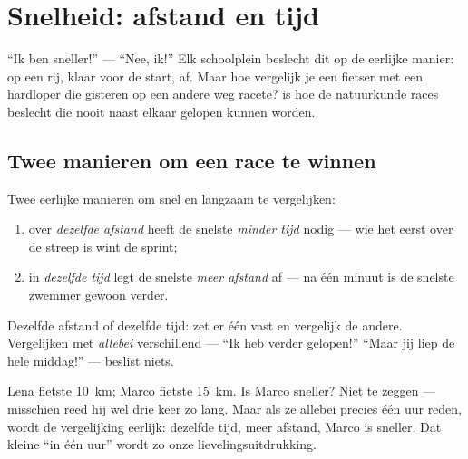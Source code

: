 \chapter{Snelheid: afstand en tijd}\label{ch:g5:speed-distance-time}

``Ik ben sneller!'' --- ``Nee, ik!'' Elk schoolplein beslecht dit op de
eerlijke manier: op een rij, klaar voor de start, af. Maar hoe
vergelijk je een fietser met een hardloper die gisteren op een andere
weg racete?  is hoe de natuurkunde races beslecht die nooit
naast elkaar gelopen kunnen worden.

\section{Twee manieren om een race te winnen}

\begin{proposition}\label{prop:g5:speed-distance-time:rules}
Twee eerlijke manieren om snel en langzaam te vergelijken:
\begin{enumerate}
  \item over \emph{dezelfde afstand} heeft de snelste \emph{minder
        tijd} nodig --- wie het eerst over de streep is wint de
        sprint;
  \item in \emph{dezelfde tijd} legt de snelste \emph{meer afstand}
        af --- na één minuut is de snelste zwemmer gewoon verder.
\end{enumerate}
Dezelfde afstand of dezelfde tijd: zet er één vast en vergelijk de
andere. Vergelijken met \emph{allebei} verschillend --- ``Ik heb
verder gelopen!'' ``Maar jij liep de hele middag!'' --- beslist niets.
\end{proposition}

\begin{example}\label{ex:g5:speed-distance-time:fair}
Lena fietste \qty{10}{km}; Marco fietste \qty{15}{km}. Is Marco
sneller? Niet te zeggen --- misschien reed hij wel drie keer zo lang.
Maar als ze allebei precies één uur reden, wordt de vergelijking
eerlijk: dezelfde tijd, meer afstand, Marco is sneller. Dat kleine ``in
één uur'' wordt zo onze lievelingsuitdrukking.
\end{example}


